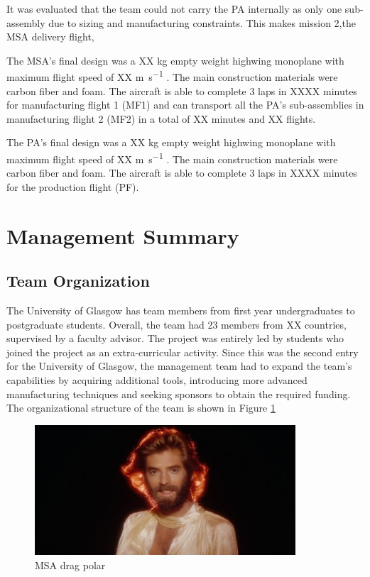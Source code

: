 It was evaluated that the team could not carry the PA internally as only one sub-assembly due to sizing and manufacturing constraints. This makes mission 2,the MSA delivery flight,


The MSA's final design was a XX \si{\kilo\gram} empty weight highwing monoplane with maximum flight speed of XX \si{\meter\per\second} . The main construction materials were carbon fiber and foam.  The aircraft is able to complete 3 laps in XXXX minutes for manufacturing flight 1 (MF1) and can transport all the PA's sub-assemblies in manufacturing flight 2 (MF2) in a total of XX minutes and XX flights. 

The PA's final design was a XX \si{\kilo\gram} empty weight highwing monoplane with maximum flight speed of XX \si{\meter\per\second} . The main construction materials were carbon fiber and foam.  The aircraft is able to complete 3 laps in XXXX minutes for the production flight (PF).



\section{Management Summary}

\subsection{Team Organization}

The University of Glasgow has team members from first year undergraduates to postgraduate students. Overall, the team had 23 members from XX countries, supervised by a faculty advisor. The project was entirely led by students who joined the project as an extra-curricular activity. Since this was the second entry for the University of Glasgow, the management team had to expand the team's capabilities by acquiring additional tools, introducing more advanced manufacturing techniques and seeking sponsors to obtain the required funding. The organizational structure of the team is shown in Figure \ref{fig:org_chart}

\begin{figure}[H]
    \centering
    \includegraphics[width=9.72cm]{./preliminary_design/fig/dummy}
    \caption{MSA drag polar}
    \label{fig:org_chart}
\end{figure}

